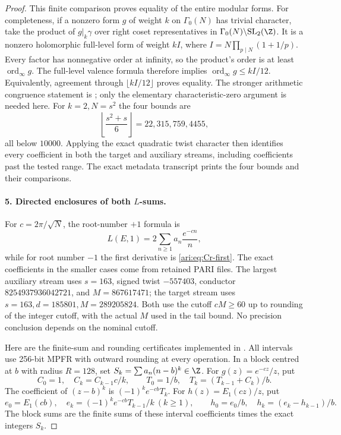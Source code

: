 \begin{proof}
This finite comparison proves equality of the entire modular forms.
For completeness, if a nonzero form $g$ of weight $k$ on
$\Gamma_0(N)$ has trivial character, take the product of
$g|_k\gamma$ over right coset representatives in
$\Gamma_0(N)\backslash\mathrm{SL}_2(\Z)$. It is a nonzero
holomorphic full-level form of weight $kI$, where
$I=N\prod_{p\mid N}(1+1/p)$. Every factor has nonnegative
order at infinity, so the product's order is at least
$\operatorname{ord}_\infty g$. The full-level valence formula
therefore implies $\operatorname{ord}_\infty g\leq kI/12$.
Equivalently, agreement through $\lfloor kI/12\rfloor$ proves
equality. The stronger arithmetic congruence statement is
\citet[Theorem 9.18]{CgzStein2007}; only the elementary
characteristic-zero argument is needed here. For $k=2,N=s^2$
the four bounds are
\[
 \left\lfloor\frac{s^2+s}{6}\right\rfloor
     =22,315,759,4455,
\]
all below $10000$. Applying the exact quadratic twist character
then identifies every coefficient in both the target and auxiliary
streams, including coefficients past the tested range. The exact
metadata transcript prints the four bounds and their comparisons.

\paragraph{5. Directed enclosures of both $L$-sums.}
For $c=2\pi/\sqrt N$, the root-number $+1$ formula is
\[
 L(E,1)=2\sum_{n\geq1}a_n\frac{e^{-cn}}n,
\]
while for root number $-1$ the first derivative is
\eqref{ari:eq:Cr-first}. The exact coefficients in the smaller cases
come from retained PARI files. The largest auxiliary stream uses
$s=163$, signed twist $-557403$, conductor
$8254937936042721$, and $M=867617471$; the target stream uses
$s=163,d=185801,M=289205824$. Both use the cutoff $cM\geq60$
up to rounding of the integer cutoff, with the actual $M$ used in
the tail bound. No precision conclusion depends on the nominal
cutoff.

Here are the finite-sum and rounding certificates implemented in
. All intervals use 256-bit
MPFR with outward rounding at every operation. In a block centred
at $b$ with radius $R=128$, set
$S_k=\sum a_n(n-b)^k\in\Z$. For $g(z)=e^{-cz}/z$, put
\[
 C_0=1,\quad C_k=C_{k-1}c/k,\qquad
 T_0=1/b,\quad T_k=(T_{k-1}+C_k)/b.
\]
The coefficient of $(z-b)^k$ is $(-1)^ke^{-cb}T_k$.
For $h(z)=E_1(cz)/z$, put
\[
 e_0=E_1(cb),\quad e_k=(-1)^ke^{-cb}T_{k-1}/k\ (k\geq1),
 \qquad h_0=e_0/b,\quad h_k=(e_k-h_{k-1})/b.
\]
The block sums are the finite sums of these interval coefficients
times the exact integers $S_k$.


\end{proof}
